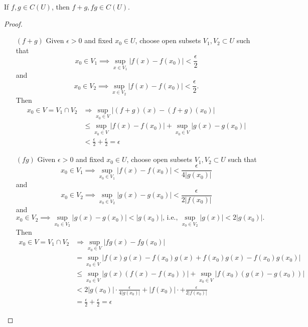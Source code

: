 \documentclass{article}
\begin{document}
\begin{multicols}{2}
\begin{exersise}
[Lemma 1.5]
If $f,g\in C(U)$, then $f+g,fg\in C(U)$.
\end{exersise}
\begin{proof}
\begin{enumerate}[label={(\alph*)}]
\item[$(f+g)$] Given $\epsilon>0$ and fixed $x_0\in U$, choose open subsets $V_1,V_2\subset U$ such that 
$$x_0\in V_1 \implies \sup_{x\in V_1}|f(x)-f(x_0)|<\frac{\epsilon}{2}$$ and $$x_0\in V_2 \implies \sup_{x\in V_2}|f(x)-f(x_0)|<\frac{\epsilon}{2}.$$
Then 
\begin{align*}
    x_0\in V=V_1\cap V_2 &\Rightarrow \sup_{x_0\in V}|(f+g)(x)-(f+g)(x_0)|\\
    &\leq \sup_{x_0\in V}|f(x)-f(x_0)|+\sup_{x_0\in V}|g(x)-g(x_0)|\\
    & < \frac{\epsilon}{2} + \frac{\epsilon}{2} = \epsilon
\end{align*}
\item[$(fg)$] Given $\epsilon>0$ and fixed $x_0\in U$, choose open subsets $V_1,V_2\subset U$ such that
$$x_0\in V_1 \implies \sup_{x_0\in V_1}|f(x)-f(x_0)|<\frac{\epsilon}{4|g(x_0)|}$$
and
$$x_0\in V_2 \implies \sup_{x_0\in V_2}|g(x)-g(x_0)|<\frac{\epsilon}{2|f(x_0)|}$$
and 
$$x_0\in V_2 \implies \sup_{x_0\in V_2}|g(x)-g(x_0)|< |g(x_0)|\text{, i.e., }\sup_{x_0\in V_2}|g(x)|<2|g(x_0)|.$$
Then
\begin{align*}
    x_0\in V=V_1\cap V_2 &\Rightarrow \sup_{x_0\in V}|fg(x)-fg(x_0)|\\
    &=\sup_{x_0\in V}|f(x)g(x)-f(x_0)g(x)+f(x_0)g(x)-f(x_0)g(x_0)|\\
    &\leq\sup_{x_0\in V}|g(x)(f(x)-f(x_0))|+\sup_{x_0\in V}|f(x_0)(g(x)-g(x_0))|\\
    &< 2|g(x_0)|\cdot \frac{\epsilon}{4|g(x_0)|} + |f(x_0)|\cdot + \frac{\epsilon}{2|f(x_0)|}\\
    &=\frac{\epsilon}{2}+\frac{\epsilon}{2}=\epsilon
\end{align*}
\end{enumerate}
\end{proof}


\end{multicols}
\end{document}
